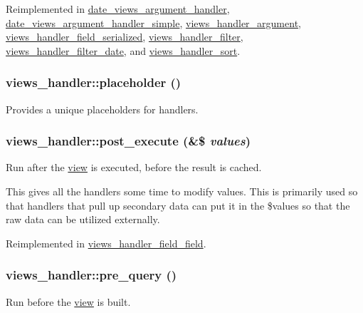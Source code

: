 Reimplemented in \hyperlink{classdate__views__argument__handler_ae970be5da3129fef9deaf4ccc2274e6c}{date\_\-views\_\-argument\_\-handler}, \hyperlink{classdate__views__argument__handler__simple_a69e0df0155f42ffff2722fa1bc4b7f7b}{date\_\-views\_\-argument\_\-handler\_\-simple}, \hyperlink{classviews__handler__argument_a0d5e9e31111cfc98588f59fc9d031cc6}{views\_\-handler\_\-argument}, \hyperlink{classviews__handler__field__serialized_a1ad7ffa8d9ea1cb01fb69c47c29600f1}{views\_\-handler\_\-field\_\-serialized}, \hyperlink{classviews__handler__filter_a1156751e912662ce47ad680cbe2c03a3}{views\_\-handler\_\-filter}, \hyperlink{classviews__handler__filter__date_a6d4e05f04a0f9ea5663f165777f54003}{views\_\-handler\_\-filter\_\-date}, and \hyperlink{classviews__handler__sort_add9d1acdd648e984ca380cc3c1c092d5}{views\_\-handler\_\-sort}.\hypertarget{classviews__handler_a15612d3988a648de68e0b3629feebcd7}{
\subsubsection[{placeholder}]{\setlength{\rightskip}{0pt plus 5cm}views\_\-handler::placeholder ()}}
\label{classviews__handler_a15612d3988a648de68e0b3629feebcd7}
Provides a unique placeholders for handlers. \hypertarget{classviews__handler_a78896f02cc58523ccc369d242d92c6a1}{
\subsubsection[{post\_\-execute}]{\setlength{\rightskip}{0pt plus 5cm}views\_\-handler::post\_\-execute (\&\$ {\em values})}}
\label{classviews__handler_a78896f02cc58523ccc369d242d92c6a1}
Run after the \hyperlink{classview}{view} is executed, before the result is cached.

This gives all the handlers some time to modify values. This is primarily used so that handlers that pull up secondary data can put it in the \$values so that the raw data can be utilized externally. 

Reimplemented in \hyperlink{classviews__handler__field__field_ad28ba30ac4cccf41187e702258883681}{views\_\-handler\_\-field\_\-field}.\hypertarget{classviews__handler_a4eeb5551d6c97b1ea074049991989fce}{
\subsubsection[{pre\_\-query}]{\setlength{\rightskip}{0pt plus 5cm}views\_\-handler::pre\_\-query ()}}
\label{classviews__handler_a4eeb5551d6c97b1ea074049991989fce}
Run before the \hyperlink{classview}{view} is built.


